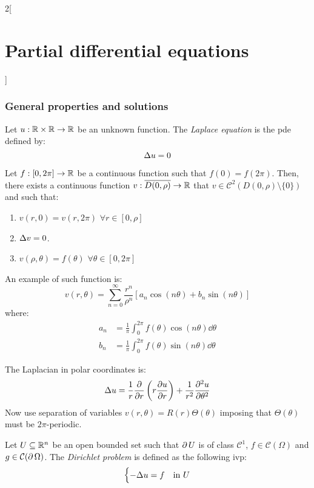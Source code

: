 \documentclass[../../../main_math.tex]{subfiles}
\begin{document}
\begin{multicols}{2}[\section{Partial differential equations}]
  \subsubsection{General properties and solutions}
  \begin{definition}
    Let $u:\mathbb{R}\times\mathbb{R}\rightarrow\mathbb{R}$ be an unknown function. The \emph{Laplace equation} is the pde defined by: $$\Delta u=0$$
  \end{definition}
  \begin{proposition}
    Let $f:[0,2\pi]\rightarrow\mathbb{R}$ be a continuous function such that $f(0)=f(2\pi)$. Then, there exists a continuous function $v:\overline{D(0,\rho)}\rightarrow\mathbb{R}$ that $v\in\mathcal{C}^2(D(0,\rho)\setminus\{0\})$ and such that:
    \begin{enumerate}
      \item $v(r,0)=v(r,2\pi)$ $\forall r\in[0,\rho]$
      \item $\Delta v=0$.
      \item $v(\rho,\theta)=f(\theta)$ $\forall\theta\in[0,2\pi]$
    \end{enumerate}
    An example of such function is:
    $$v(r,\theta)=\sum_{n=0}^\infty \frac{r^n}{\rho^n}\left[a_n\cos\left(n\theta\right)+ b_n\sin\left(n\theta\right)\right]$$ where:
    \begin{align*}
      a_n & =\frac{1}{\pi}\int_{0}^{2\pi} f(\theta)\cos\left(n\theta\right)\dd{\theta} \\
      b_n & =\frac{1}{\pi}\int_{0}^{2\pi} f(\theta)\sin\left(n\theta\right)\dd{\theta}
    \end{align*}
  \end{proposition}
  \begin{sproof}
    The Laplacian in polar coordinates is: $$\Delta u=\frac{1}{r}\pdv{}{r}\left(r\pdv{u}{r}\right)+\frac{1}{r^2}\pdv[2]{u}{\theta}$$ Now use separation of variables $v(r,\theta)=R(r)\Theta(\theta)$ imposing that $\Theta(\theta)$ must be $2\pi$-periodic.
  \end{sproof}
  \begin{definition}
    Let $U\subseteq \mathbb{R}^n$ be an open bounded set such that $\operatorname{\partial}{U}$ is of class $\mathcal{C}^1$, $f\in\mathcal{C}(\Omega)$ and $g\in\mathcal{C}(\operatorname{\partial}{\Omega})$. The \emph{Dirichlet problem} is defined as the following ivp:
    \begin{equation}\label{PDE:dirichlet}
      \begin{cases}
        -\Delta{u} = f & \text{in $U$}      \\

\end{cases}
\end{equation}
\end{definition}
\end{multicols}
\end{document}
